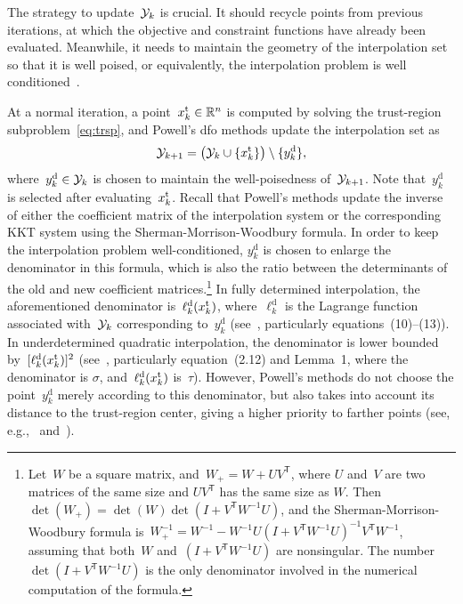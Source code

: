 \documentclass[
    smallextended,  %
    final,        %
]{svjour3}
\newcommand{\R}{\mathbb{R}}
\newcommand{\T}{\mathsf{T}}
\newcommand{\drop}{{\text{d}}}
\newcommand{\iter}[1][k]{x\ifthenelse{\equal{#1}{}}{}{_{#1}}}
\newcommand{\set}[2][]{#1\{#2#1\}}
\newcommand{\trust}{{\text{t}}}
\newcommand{\xpt}[1][k]{\mathcal{Y}\ifthenelse{\equal{#1}{}}{}{_{#1}}}
\newcommand{\kkt}{KKT\xspace}
\begin{document}
The strategy to update~$\xpt$ is crucial.
It should recycle points from previous iterations, at which the objective and constraint functions
have already been evaluated.
Meanwhile, it needs to maintain the geometry of the interpolation set so that it is well poised,
or equivalently,
the interpolation problem is well conditioned~\cite{Sauer_Xu_1995,Conn_Scheinberg_Vicente_2009b}.

At a normal iteration, a point~$\iter^{\trust} \in \R^n$ is computed by solving the trust-region
subproblem~\eqref{eq:trsp}, and Powell's \gls{dfo} methods update the interpolation set as
\begin{equation}
    \label{eq:xpt-update-tr}
    \xpt[k + 1] = \big(\xpt \cup \set{\iter^{\trust}}\big) \setminus \set{y_k^{\drop}},
\end{equation}
where~$y_k^{\drop} \in \xpt$ is chosen to maintain the well-poisedness of~$\xpt[k + 1]$.
Note that~$y_k^{\drop}$ is selected after evaluating~$\iter^{\trust}$.
Recall that Powell's methods update the inverse of either the coefficient matrix of the
interpolation system or the corresponding \kkt system using the Sherman-Morrison-Woodbury formula.
In order to keep the interpolation problem well-conditioned, $y_k^{\drop}$ is chosen
to enlarge the denominator in this formula, which is also the ratio between
the determinants of the old and new coefficient matrices.\footnote{
    Let~$W$ be a square matrix, and~$W_+ = W + UV^\T$, where $U$ and~$V$ are two
    matrices of the same size and $UV^\T$ has the same size as $W$.
    Then~$\det(W_+) = \det(W)\det(I+V^\T W^{-1}U)$, and the
    Sherman-Morrison-Woodbury formula
    is~$W_+^{-1} = W^{-1} -W^{-1}U(I+V^\T W^{-1}U)^{-1} V^\T W^{-1}$, assuming that both~$W$
    and~$(I+V^\T W^{-1}U)$ are nonsingular. The number~$\det(I+V^\T W^{-1}U)$ is the only
    denominator involved in the numerical computation of the formula.
}
In fully determined interpolation, the aforementioned denominator is~$\ell_k^\drop(\iter^{\trust})$,
where~$\ell_k^\drop$ is the Lagrange function associated with~$\xpt$ corresponding to~$y_k^\drop$
(see~\mbox{\cite[\S~2]{Powell_2001}}, particularly equations~(10)--(13)).
In underdetermined quadratic interpolation, the denominator is lower
bounded by~$[\ell_k^{\drop}(\iter^{\trust})]^2$ (see~\mbox{\cite[\S~2]{Powell_2004c}}, particularly
equation~(2.12) and Lemma~1, where the denominator is $\sigma$, and~$\ell_k^{\drop}(\iter^{\trust})$
is~$\tau$).
However, Powell's methods do not choose the point~$y_k^\drop$ merely according to this denominator, but also
takes into account its distance to the trust-region center, giving a higher priority to farther
points (see, e.g.,~\cite[equation~(56)]{Powell_2002} and~\cite[equations~(7.4)--(7.5)]{Powell_2006}).
\end{document}
